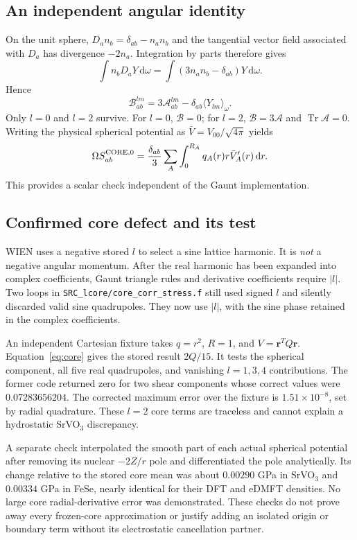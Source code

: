 \documentclass[11pt]{article}
\newcommand{\Tr}{\operatorname{Tr}}
\newcommand{\dd}{\mathrm d}
\begin{document}
\subsection{An independent angular identity}
On the unit sphere, $D_an_b=\delta_{ab}-n_an_b$ and the tangential vector field associated with $D_a$ has divergence $-2n_a$. Integration by parts therefore gives
\begin{equation}
 \int n_bD_aY\,\dd\omega=
 \int(3n_an_b-\delta_{ab})Y\,\dd\omega.
\end{equation}
Hence
\begin{equation}\label{eq:angularidentity}
 \boxed{\mathcal B^{lm}_{ab}=3\mathcal A^{lm}_{ab}
 -\delta_{ab}\langle Y_{lm}\rangle_\omega.}
\end{equation}
Only $l=0$ and $l=2$ survive. For $l=0$, $\mathcal B=0$; for $l=2$, $\mathcal B=3\mathcal A$ and $\Tr\mathcal A=0$. Writing the physical spherical potential as $\bar V=V_{00}/\sqrt{4\pi}$ yields
\begin{equation}
 \Omega S^{{\rm CORE},0}_{ab}=
 \frac{\delta_{ab}}3\sum_A\int_0^{R_A}q_A(r)r\bar V'_A(r)\,\dd r.
\end{equation}
This provides a scalar check independent of the Gaunt implementation.

\subsection{Confirmed core defect and its test}
WIEN uses a negative stored $l$ to select a sine lattice harmonic. It is \emph{not} a negative angular momentum. After the real harmonic has been expanded into complex coefficients, Gaunt triangle rules and derivative coefficients require $|l|$. Two loops in \nolinkurl{SRC_lcore/core_corr_stress.f} still used signed $l$ and silently discarded valid sine quadrupoles. They now use $|l|$, with the sine phase retained in the complex coefficients.

An independent Cartesian fixture takes $q=r^2$, $R=1$, and $V=\bm r^TQ\bm r$. Equation~\eqref{eq:core} gives the stored result $2Q/15$. It tests the spherical component, all five real quadrupoles, and vanishing $l=1,3,4$ contributions. The former code returned zero for two shear components whose correct values were $0.07283656204$. The corrected maximum error over the fixture is $1.51\times10^{-8}$, set by radial quadrature. These $l=2$ core terms are traceless and cannot explain a hydrostatic SrVO$_3$ discrepancy.

A separate check interpolated the smooth part of each actual spherical potential after removing its nuclear $-2Z/r$ pole and differentiated the pole analytically. Its change relative to the stored core mean was about $0.00290$ GPa in SrVO$_3$ and $0.00334$ GPa in FeSe, nearly identical for their DFT and eDMFT densities. No large core radial-derivative error was demonstrated. These checks do not prove away every frozen-core approximation or justify adding an isolated origin or boundary term without its electrostatic cancellation partner.
\end{document}
